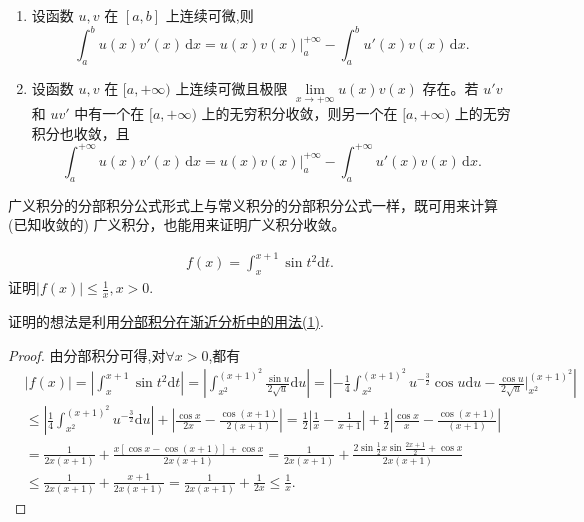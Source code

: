 \documentclass[../../main.tex]{subfiles}%
\begin{document}
\begin{theorem}[分部积分公式]\label{theorem:分部积分公式}
\begin{enumerate}
\item 设函数 \( u, v \) 在 \([a, b]\) 上连续可微,则
\[
\int_a^b{u\left( x \right) v' \left( x \right) \,\mathrm{d}x}=u\left( x \right) v\left( x \right) \Big|_{a}^{+\infty}-\int_a^b{u'\left( x \right) v\left( x \right) \,\mathrm{d}x}.
\]

\item 设函数 \( u, v \) 在 \([a, +\infty)\) 上连续可微且极限 \( \lim\limits_{x \to +\infty} u(x)v(x) \) 存在。若 \( u'v \) 和 \( uv' \) 中有一个在 \([a, +\infty)\) 上的无穷积分收敛，则另一个在 \([a, +\infty)\) 上的无穷积分也收敛，且
\[
\int_a^{+\infty} u(x)v'(x) \, \mathrm{d}x = u(x)v(x) \Big |_a^{+\infty} - \int_a^{+\infty} u'(x)v(x) \, \mathrm{d}x.
\]
\end{enumerate}
\end{theorem}
\begin{remark}
广义积分的分部积分公式形式上与常义积分的分部积分公式一样，既可用来计算 (已知收敛的) 广义积分，也能用来证明广义积分收敛。
\end{remark}

\begin{example}
\begin{align*}
f\left( x \right) =\int_x^{x+1}{\sin t^2 \mathrm{d}t}.
\end{align*}
证明$\left| f\left( x \right) \right|\leqslant \frac{1}{x},x>0$.
\end{example}
\begin{note}
证明的想法是利用\hyperref[分部积分在渐近分析中的用法(1)]{分部积分在渐近分析中的用法(1)}.
\end{note}
\begin{proof}

由分部积分可得,对$\forall x>0$,都有
\begin{align*}
&\left| f\left( x \right) \right|=\left| \int_x^{x+1}{\sin t^2  \mathrm{d}t} \right|=\left| \int_{x^2}^{\left( x+1 \right) ^2}{\frac{\sin u}{2\sqrt{u}}\mathrm{d}u} \right|=\left| -\frac{1}{4}\int_{x^2}^{\left( x+1 \right) ^2}{u^{-\frac{3}{2}}\cos u\mathrm{d}u}-\frac{\cos u}{2\sqrt{u}}\Big|_{x^2}^{\left( x+1 \right) ^2} \right|
\\
&\leqslant \left| \frac{1}{4}\int_{x^2}^{\left( x+1 \right) ^2}{u^{-\frac{3}{2}}\mathrm{d}u} \right|+\left| \frac{\cos x}{2x}-\frac{\cos \left( x+1 \right)}{2\left( x+1 \right)} \right|=\frac{1}{2}\left| \frac{1}{x}-\frac{1}{x+1} \right|+\frac{1}{2}\left| \frac{\cos x}{x}-\frac{\cos \left( x+1 \right)}{\left( x+1 \right)} \right|
\\
&=\frac{1}{2x\left( x+1 \right)}+\frac{x\left[ \cos x-\cos \left( x+1 \right) \right] +\cos x}{2x\left( x+1 \right)}=\frac{1}{2x\left( x+1 \right)}+\frac{2\sin \frac{1}{2}x\sin \frac{2x+1}{2}+\cos x}{2x\left( x+1 \right)}
\\
&\leqslant \frac{1}{2x\left( x+1 \right)}+\frac{x+1}{2x\left( x+1 \right)}=\frac{1}{2x\left( x+1 \right)}+\frac{1}{2x}\leqslant \frac{1}{x}.
\end{align*}

\end{proof}
\end{document}
